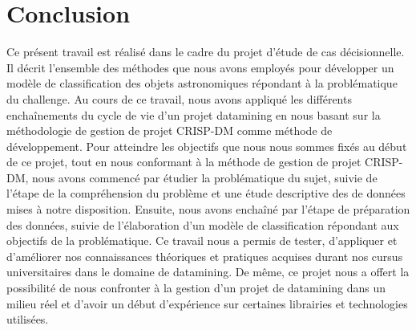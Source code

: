 \chapter*{Conclusion}
Ce présent travail est réalisé dans le cadre du projet d'étude de cas décisionnelle. Il décrit l'ensemble des méthodes que nous avons employés pour développer un modèle de classification des objets astronomiques répondant à la problématique du challenge.
\newline Au cours de ce travail, nous avons appliqué les différents enchaînements du cycle de vie d'un projet datamining en nous basant sur la méthodologie de gestion de projet CRISP-DM comme méthode de développement.
\newline
Pour atteindre les objectifs que nous nous sommes fixés au début de ce projet, tout en nous conformant à la méthode de gestion de projet CRISP-DM, nous avons commencé par étudier la problématique du sujet, suivie de l'étape de la compréhension du problème et une étude descriptive des de données mises à notre disposition.
\newline Ensuite, nous avons enchaîné par l'étape de préparation des données, suivie de l'élaboration d'un modèle de classification répondant aux objectifs de la problématique.
\newline Ce travail nous a permis de tester, d'appliquer et d'améliorer nos connaissances théoriques et pratiques acquises durant nos cursus universitaires dans le domaine de datamining. De même, ce projet nous a offert la possibilité de nous confronter à la gestion d'un projet de datamining dans un milieu réel et d'avoir un début d'expérience sur certaines librairies et technologies utilisées.
